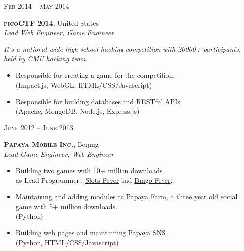 \documentclass[10pt]{article}
\begin{document}
{\begin{minipage}[t]{0.5\textwidth}

{\raggedleft\textsc{Feb 2014 -- May 2014}\par}

{\raggedright\large \textbf{\textsc{picoCTF 2014}}, United States\\
\textit{Lead Web Engineer, Game Engineer}\\[5pt]}

\textit{It’s a national wide high school hacking competition with 20000+ participants, held by CMU hacking team.}
\begin{itemize}
	\item Responsible for creating a game for the competition. \\
	(Impact.js, WebGL, HTML/CSS/Javascript)
	\item Responsible for building databases and RESTful APIs. \\
	(Apache, MongoDB, Node.js, Express.js)
\end{itemize}


{\raggedleft\textsc{June 2012 -- June 2013}\par}

{\raggedright\large \textbf{\textsc{Papaya Mobile Inc.}}, Beijing\\
\textit{Lead Game Engineer, Web Engineer}\\[5pt]}

\begin{itemize}
	\item Building two games with 10+ million downloads, \\
	as Lead Programmer : 
	\href{https://play.google.com/store/apps/details?id=com.kakapo.freeslots}{Slots Fever} and \href{https://play.google.com/store/apps/details?id=com.kakapo.bingo}{Bingo Fever}.
	\item Maintaining and adding modules to Papaya Farm, a three year old social game with 5+ million downloads. \\
	(Python)
	\item Building web pages and maintaining Papaya SNS. \\
	(Python, HTML/CSS/Javascript)
\end{itemize}



\end{minipage}}
\end{document}
